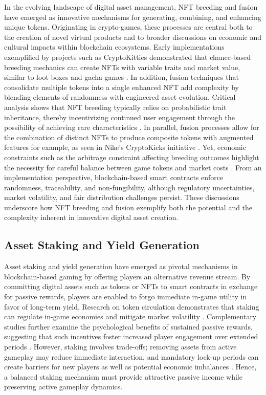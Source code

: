 In the evolving landscape of digital asset management, NFT breeding and fusion
have emerged as innovative mechanisms for generating, combining, and enhancing
unique tokens. Originating in crypto-games, these processes are central both to
the creation of novel virtual products and to broader discussions on economic
and cultural impacts within blockchain ecosystems. Early
implementations exemplified by projects such as CryptoKitties demonstrated that
chance-based breeding mechanics can create NFTs with variable traits and market
value, similar to loot boxes and gacha games
\cite{oliverjamesscholtenEthereumCryptoGamesMechanics2019}. In addition, fusion
techniques that consolidate multiple tokens into a single enhanced NFT add
complexity by blending elements of randomness with engineered asset evolution.
Critical analysis shows that NFT breeding typically relies on probabilistic
trait inheritance, thereby incentivizing continued user engagement through the
possibility of achieving rare characteristics
\cite{oliverjamesscholtenEthereumCryptoGamesMechanics2019}. In parallel, fusion
processes allow for the combination of distinct NFTs to produce composite tokens
with augmented features for example, as seen in Nike’s CryptoKicks initiative
\cite{volodevaBlockchainFashionIndustry2024}. Yet, economic constraints such as
the arbitrage constraint affecting breeding outcomes highlight the necessity for
careful balance between game tokens and market costs
\cite{meisterNFTsGameAfoot2022}. From an implementation perspective,
blockchain-based smart contracts enforce randomness, traceability, and
non-fungibility, although regulatory uncertainties, market volatility, and fair
distribution challenges persist. These discussions underscore how NFT breeding
and fusion exemplify both the potential and the complexity inherent in
innovative digital asset creation.

\subsection{Asset Staking and Yield Generation}

Asset staking and yield generation have emerged as pivotal mechanisms in
blockchain-based gaming by offering players an alternative revenue stream. By
committing digital assets such as tokens or NFTs to smart contracts in exchange
for passive rewards, players are enabled to forgo immediate in-game utility in
favor of long-term yield. Research on token circulation demonstrates that
staking can regulate in-game economies and mitigate market volatility
\cite{yuSoKPlaytoEarnProjects2022a}. Complementary studies further examine the
psychological benefits of sustained passive rewards, suggesting that such
incentives foster increased player engagement over extended periods
\cite{duguleanaEmergingTrendsPlaytoEarn2024}. However, staking involves
trade-offs; removing assets from active gameplay may reduce immediate
interaction, and mandatory lock-up periods can create barriers for new players
as well as potential economic imbalances
\cite{meisterbernhardkNFTsGameAfoot2022}. Hence, a balanced staking mechanism
must provide attractive passive income while preserving active gameplay
dynamics.

